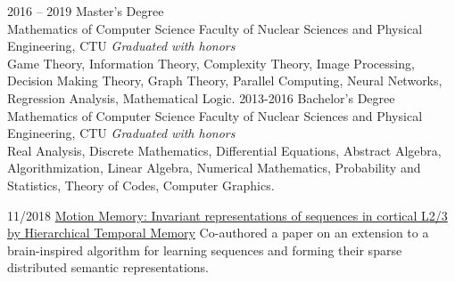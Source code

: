 \documentclass[9pt]{developercv} %
\begin{document}
\begin{entrylist}
	\entry
		{2016 -- 2019}
		{Master's Degree\\\footnotesize{Mathematics of Computer Science}}
		{Faculty of Nuclear Sciences and Physical Engineering, CTU}
        {\emph{Graduated with honors}\\Game Theory, Information Theory, Complexity Theory, Image Processing, Decision Making Theory, Graph Theory, Parallel Computing, Neural Networks, Regression Analysis, Mathematical Logic.}
	\entry
		{2013-2016}
		{Bachelor's Degree\\\footnotesize{Mathematics of Computer Science}}
		{Faculty of Nuclear Sciences and Physical Engineering, CTU}
		{\emph{Graduated with honors}\\Real Analysis, Discrete Mathematics, Differential Equations, Abstract Algebra, Algorithmization, Linear Algebra, Numerical Mathematics, Probability and Statistics, Theory of Codes, Computer Graphics.}
\end{entrylist}


\begin{entrylist}
	\entry
	  {11/2018}
	  {\href{https://www.sciencedirect.com/science/article/pii/S1877050918323792}{Motion Memory: Invariant representations of sequences in cortical L2/3 by Hierarchical Temporal Memory}}
	  {}
	  {Co-authored a paper on an extension to a brain-inspired algorithm for learning sequences and forming their sparse distributed semantic representations.}
\end{entrylist}

\end{document}
